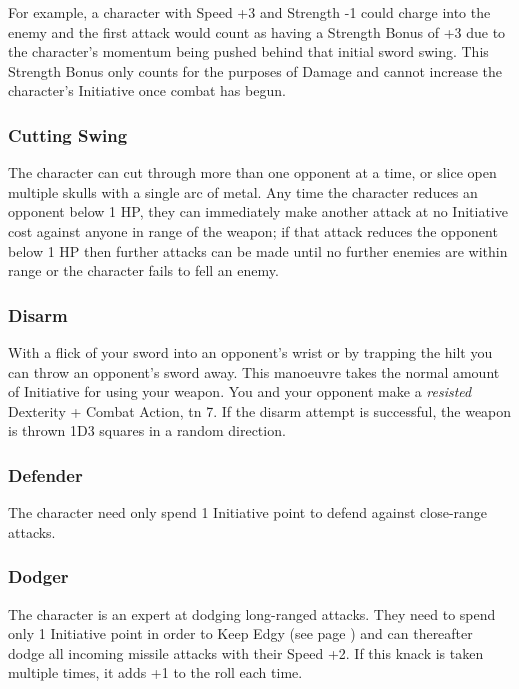 \documentclass[titlepage,a4paper,openany]{book}
\begin{document}
\begin{multicols}{2}
For example, a character with Speed +3 and Strength -1 could charge into the enemy and the first attack would count as having a Strength Bonus of +3 due to the character's momentum being pushed behind that initial sword swing. This Strength Bonus only counts for the purposes of Damage and cannot increase the character's Initiative once combat has begun.

\subsubsection{Cutting Swing}

The character can cut through more than one opponent at a time, or slice open multiple skulls with a single arc of metal.  Any time the character reduces an opponent below 1 HP, they can immediately make another attack at no Initiative cost against anyone in range of the weapon; if that attack reduces the opponent below 1 HP then further attacks can be made until no further enemies are within range or the character fails to fell an enemy.

\subsubsection{Disarm}

With a flick of your sword into an opponent's wrist or by trapping the hilt you can throw an opponent's sword away. This manoeuvre takes the normal amount of Initiative for using your weapon. You and your opponent make a \textit{resisted} Dexterity + Combat Action, \gls{tn} 7. If the disarm attempt is successful, the weapon is thrown 1D3 squares in a random direction.

\subsubsection{Defender}

The character need only spend 1 Initiative point to defend against close-range attacks.

\subsubsection{Dodger}

The character is an expert at dodging long-ranged attacks. They need to spend only 1 Initiative point in order to Keep Edgy (see page \pageref{edgy}) and can thereafter dodge all incoming missile attacks with their Speed +2. If this knack is taken multiple times, it adds +1 to the roll each time.


\end{multicols}
\end{document}
